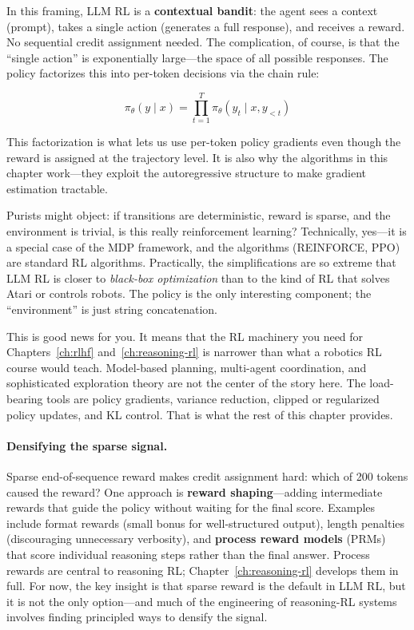 In this framing, LLM RL is a \textbf{contextual bandit}: the agent sees a context (prompt), takes a single action (generates a full response), and receives a reward. No sequential credit assignment needed. The complication, of course, is that the ``single action'' is exponentially large---the space of all possible responses. The policy factorizes this into per-token decisions via the chain rule:

\begin{equation}
\label{eq:trajectory-policy}
\pi_\theta(y \mid x) = \prod_{t=1}^{T} \pi_\theta(y_t \mid x, y_{<t})
\end{equation}

This factorization is what lets us use per-token policy gradients even though the reward is assigned at the trajectory level. It is also why the algorithms in this chapter work---they exploit the autoregressive structure to make gradient estimation tractable.

\begin{tcolorbox}[colback=blue!5, colframe=blue!40, title=\textbf{Is LLM RL ``Real'' RL?}]
Purists might object: if transitions are deterministic, reward is sparse, and the environment is trivial, is this really reinforcement learning? Technically, yes---it is a special case of the MDP framework, and the algorithms (REINFORCE, PPO) are standard RL algorithms. Practically, the simplifications are so extreme that LLM RL is closer to \emph{black-box optimization} than to the kind of RL that solves Atari or controls robots. The policy is the only interesting component; the ``environment'' is just string concatenation.

This is good news for you. It means that the RL machinery you need for Chapters~\ref{ch:rlhf} and~\ref{ch:reasoning-rl} is narrower than what a robotics RL course would teach. Model-based planning, multi-agent coordination, and sophisticated exploration theory are not the center of the story here. The load-bearing tools are policy gradients, variance reduction, clipped or regularized policy updates, and KL control. That is what the rest of this chapter provides.
\end{tcolorbox}

\paragraph{Densifying the sparse signal.} Sparse end-of-sequence reward makes credit assignment hard: which of 200 tokens caused the reward? One approach is \textbf{reward shaping}---adding intermediate rewards that guide the policy without waiting for the final score. Examples include format rewards (small bonus for well-structured output), length penalties (discouraging unnecessary verbosity), and \textbf{process reward models} (PRMs) that score individual reasoning steps rather than the final answer. Process rewards are central to reasoning RL; Chapter~\ref{ch:reasoning-rl} develops them in full. For now, the key insight is that sparse reward is the default in LLM RL, but it is not the only option---and much of the engineering of reasoning-RL systems involves finding principled ways to densify the signal.

